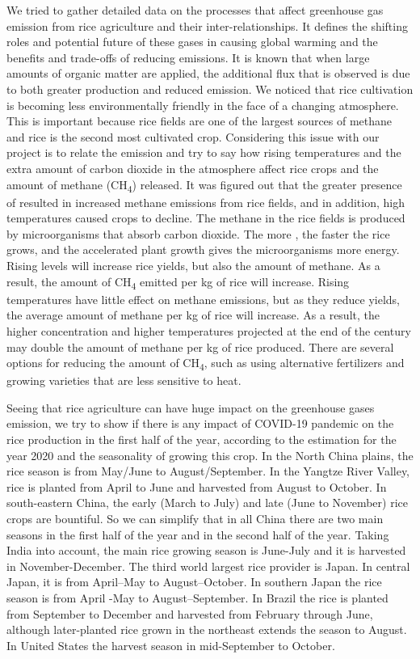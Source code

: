 We tried to gather detailed data on the processes that affect greenhouse gas emission from rice agriculture and their inter-relationships. It defines the shifting roles and potential future of these gases in causing global warming and the benefits and trade-offs of reducing emissions. It is known that when large amounts of organic matter are applied, the additional flux that is observed is due to both greater production and reduced emission. We noticed that rice cultivation is becoming less environmentally friendly in the face of a changing atmosphere. This is important because rice fields are one of the largest sources of methane and rice is the second most cultivated crop. Considering this issue with our project is to relate the \co emission and try to say how rising temperatures and the extra amount of carbon dioxide in the atmosphere affect rice crops and the amount of methane (CH\textsubscript{4}) released. It was figured out that the greater presence of \co resulted in increased methane emissions from rice fields, and in addition, high temperatures caused crops to decline. The methane in the rice fields is produced by microorganisms that absorb carbon dioxide. The more \co, the faster the rice grows, and the accelerated plant growth gives the microorganisms more energy. Rising \co levels will increase rice yields, but also the amount of methane. As a result, the amount of CH\textsubscript{4} emitted per kg of rice will increase. Rising temperatures have little effect on methane emissions, but as they reduce yields, the average amount of methane per kg of rice will increase. As a result, the higher \co concentration and higher temperatures projected at the end of the century may double the amount of methane per kg of rice produced. There are several options for reducing the amount of CH\textsubscript{4}, such as using alternative fertilizers and growing varieties that are less sensitive to heat.

Seeing that rice agriculture can have huge impact on the greenhouse gases emission, we try to show if there is any impact of COVID-19 pandemic on the rice production in the first half of the year, according to the estimation for the year 2020 and the seasonality of growing this crop. In the North China plains, the rice season is from May/June to August/September. In the Yangtze River Valley, rice is planted from April to June and harvested from August to October. In south-eastern China, the early (March to July) and late (June to November) rice crops are bountiful. So we can simplify that in all China there are two main seasons in the first half of the year and in the second half of the year. Taking India into account, the main rice growing season is June-July and it is harvested in November-December. The third world largest rice provider is Japan. In central Japan, it is from April–May to August–October. In southern Japan the rice season is from April -May to August–September. In Brazil the rice is planted from September to December and harvested from February through June, although later-planted rice grown in the northeast extends the season to August. In United States the harvest season in mid-September to October. 

